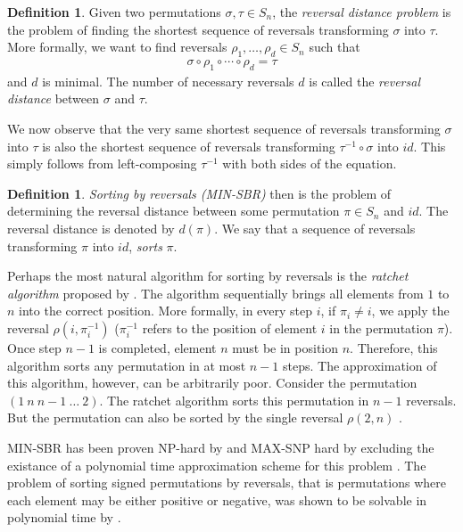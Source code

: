 \documentclass[11pt,DIV=11]{scrartcl}
\theoremstyle{definition}
\newtheorem{definition}[theorem]{Definition}
\theoremstyle{remark}
\begin{document}
\begin{definition}
Given two permutations $\sigma, \tau \in S_n$, the \textit{reversal distance problem} is the problem of finding the shortest sequence of reversals transforming $\sigma$ into $\tau$. More formally, we want to find reversals $\rho_1, \dots, \rho_d \in S_n$ such that
\begin{align*}
    \sigma \circ \rho_1 \circ \cdots \circ \rho_d = \tau
\end{align*}
and $d$ is minimal.
The number of necessary reversals $d$ is called the \textit{reversal distance} between $\sigma$ and $\tau$.
\end{definition}

We now observe that the very same shortest sequence of reversals transforming $\sigma$ into $\tau$ is also the shortest sequence of reversals transforming $\tau^{-1} \circ \sigma$ into $id$. This simply follows from left-composing $\tau^{-1}$ with both sides of the equation.

\begin{definition}
\textit{Sorting by reversals (MIN-SBR)} then is the problem of determining the reversal distance between some permutation $\pi \in S_n$ and $id$. The reversal distance is denoted by $d(\pi)$. We say that a sequence of reversals transforming $\pi$ into $id$, \textit{sorts} $\pi$.
\end{definition}

Perhaps the most natural algorithm for sorting by reversals is the \textit{ratchet algorithm} proposed by \citeauthor*{Watterson19821} \cite{Watterson19821}. The algorithm sequentially brings all elements from $1$ to $n$ into the correct position. More formally, in every step $i$, if $\pi_i \neq i$, we apply the reversal $\rho(i, \pi_i^{-1})$ ($\pi_i^{-1}$ refers to the position of element $i$ in the permutation $\pi$). Once step $n-1$ is completed, element $n$ must be in position $n$. Therefore, this algorithm sorts any permutation in at most $n-1$ steps. The approximation of this algorithm, however, can be arbitrarily poor. Consider the permutation $(1\ n\ n-1\ \dots\ 2)$. The ratchet algorithm sorts this permutation in $n-1$ reversals. But the permutation can also be sorted by the single reversal $\rho(2, n)$ \cite{Kececioglu1995}.

MIN-SBR has been proven NP-hard by \citeauthor*{Caprara1997} \cite{Caprara1997} and MAX-SNP hard by \citeauthor*{Berman1999} excluding the existance of a polynomial time approximation scheme for this problem \cite{Berman1999}. The problem of sorting signed permutations by reversals, that is permutations where each element may be either positive or negative, was shown to be solvable in polynomial time by \citeauthor*{Hannenhalli1995} \cite{Hannenhalli1995}.
\end{document}
